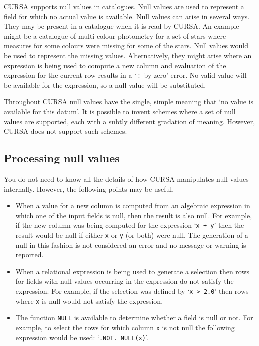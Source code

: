 \documentclass[twoside,11pt]{starlink}
\begin{document}
CURSA supports null values in catalogues. Null values are used to represent
a field for which no actual value is available. Null values can arise in
several ways. They may be present in a catalogue when it is read by
CURSA. An example might be a catalogue of multi-colour photometry for a
set of stars where measures for some colours were missing for some of the
stars. Null values would be used to represent the missing values.
Alternatively, they might arise where an expression is being used to
compute a new column and evaluation of the expression for the current
row results in a `$\div$ by zero' error. No valid value will be
available for the expression, so a null value will be substituted.

Throughout CURSA null values have the single, simple meaning that `no value
is available for this datum'. It is possible to invent schemes where a set
of null values are supported, each with a subtly different gradation of
meaning. However, CURSA does not support such schemes.

\subsection{Processing null values}

You do not need to know all the details of how CURSA manipulates null
values internally. However, the following points may be useful.

\begin{itemize}

  \item When a value for a new column is computed from an algebraic
   expression in which one of the input fields is null, then the
   result is also null. For example, if the new column was being
   computed for the expression `\texttt{x + y}' then the result would be
   null if either \texttt{x} or \texttt{y} (or both) were null. The generation
   of a null in this fashion is not considered an error and no message
   or warning is reported.

  \item When a relational expression is being used to generate a selection
   then rows for fields with null values occurring in the expression do not
   satisfy the expression. For example, if the selection was defined by
   `\texttt{x > 2.0}' then rows where \texttt{x} is null would not satisfy
   the expression.

  \item The function \texttt{NULL} is available to determine whether a
   field is null or not. For example, to select the rows for which
   column \texttt{x} is not null the following expression would be used:
   `\texttt{.NOT. NULL(x)}'.

\end{itemize}
\end{document}
